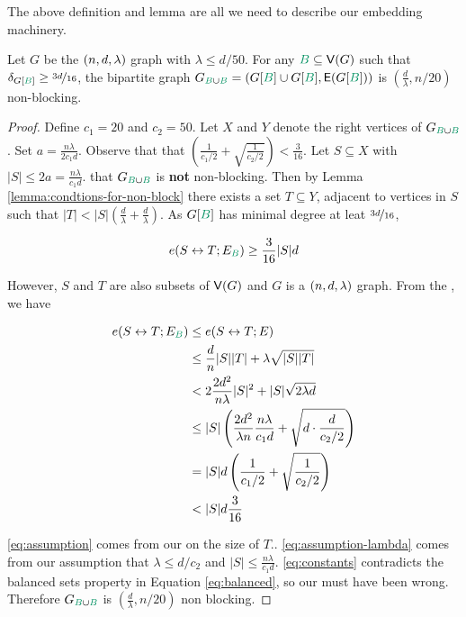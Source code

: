 \documentclass[11pt]{article}
\begin{document}
The above definition and lemma are all we need to describe our embedding machinery.

\begin{lemma}\label{lemma:bipartitie-is-non-blocking}Let $G$ be the $(n, d, \lambda)$ graph with $\lambda \leq d/50$. For any $\GreenB \subseteq \Vertices{G}$ such that $\MinimalDegree{G[\GreenB]} \geq \nicefrac{3d}{16}$,
 the bipartite graph  $\BipartiteG = (G[\GreenB] \cup G[\GreenB], \Edges{G[\GreenB]})$ is $(\frac{d}{\lambda},  n/20)$ non-blocking.
\end{lemma}

\begin{proof}
  Define $c_1 = 20$ and $c_2 = 50$. Let $X$ and $Y$ denote the right vertices of $\BipartiteG$.
  Set $a = \frac{n\lambda}{2c_1 d}$.
  Observe that that $\left(\frac{1}{c_1/2}  + \sqrt{\frac{1}{c_2/2}}\right) < \frac{3}{16}$.
Let $S \subseteq X$ with $|S| \leq 2a = \frac{n\lambda}{c_1 d}$.
 that $\BipartiteG$ is \textbf{not} non-blocking.
  Then by Lemma \ref{lemma:condtions-for-non-block} there exists a set $T \subseteq Y$, adjacent to vertices in $S$ such that $|T| < |S|(\frac{d}{\lambda}+\frac{d}{\lambda})$.
As $G[\GreenB]$ has minimal degree at leat $\nicefrac{3d}{16}$,

\begin{equation}\label{eq:balanced}
  \CutEdges{S}{T}{E_{\GreenB}} \geq \frac{3}{16}|S|d
\end{equation}

However, $S$ and $T$ are also subsets of $\mathsf{V}(G)$ and $G$ is a $(n, d, \lambda)$ graph.
From the , we have

\begin{align}
  \CutEdges{S}{T}{E_{\GreenB}} &\leq   \CutEdges{S}{T}{E} \\
  &\leq \frac{d}{n}|S||T| + \lambda\sqrt{|S||T|} \\
	&< 2\frac{2d^2}{n\lambda}|S|^2 + |S|\sqrt{2\lambda d} \label{eq:assumption}\\
	&\leq |S|\left(\frac{2d^2}{\lambda n} \frac{n\lambda}{c_1 d} + \sqrt{d\cdot \frac{d}{c_2/2}}\right) \label{eq:assumption-lambda}\\
	&= |S|d\left(\frac{1}{c_1/2}  + \sqrt{\frac{1}{c_2/2}}\right) \\
	&< |S|d\frac{3}{16} \label{eq:constants}
\end{align}

\eqref{eq:assumption} comes from our  on the size of $T$..
\eqref{eq:assumption-lambda} comes from our assumption that $\lambda \leq  d/c_2$ and $|S| \leq \frac{n\lambda}{c_1 d}$.
\eqref{eq:constants} contradicts the balanced sets property in Equation \eqref{eq:balanced}, so our  must have been wrong.
Therefore $\BipartiteG$ is $(\frac{d}{\lambda}, n/20)$ non blocking.
\end{proof}
\end{document}

